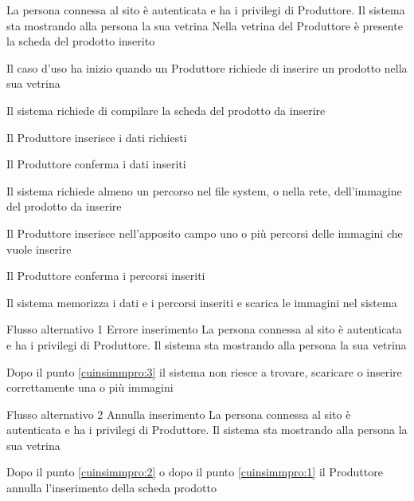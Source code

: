 
{}
{La persona connessa al sito è autenticata e ha i privilegi di Produttore. Il sistema sta mostrando alla persona la sua vetrina}
{Nella vetrina del Produttore è presente la scheda del prodotto inserito}
{\begin{enumCU}
		\item Il caso d'uso ha inizio quando un Produttore richiede di inserire un prodotto nella sua vetrina
		\item Il sistema richiede di compilare la scheda del prodotto da inserire
		\item Il Produttore inserisce i dati richiesti\label{cuinsimmpro:1}
		\item Il Produttore conferma i dati inseriti 
		\item Il sistema richiede almeno un percorso nel file system, o nella rete, dell'immagine del prodotto da inserire
		\item Il Produttore inserisce nell'apposito campo uno o più percorsi  delle immagini che vuole inserire\label{cuinsimmpro:2}
		\item Il Produttore conferma i percorsi inseriti\label{cuinsimmpro:3}
		\item Il sistema memorizza i dati e i percorsi inseriti e scarica le immagini nel sistema
	\end{enumCU}}
%
{Flusso alternativo 1}%
{Errore inserimento}%
{La persona connessa al sito è autenticata e ha i privilegi di Produttore. Il sistema sta mostrando alla persona la sua vetrina}%
{\postNulle}%
{\begin{enumCU}
		\item Dopo il punto \ref{cuinsimmpro:3} il sistema non riesce a trovare, scaricare o inserire correttamente una o più immagini
	\end{enumCU}}%
%
{Flusso alternativo 2}%
{Annulla inserimento}%
{La persona connessa al sito è autenticata e ha i privilegi di Produttore. Il sistema sta mostrando alla persona la sua vetrina}%
{\postNulle}%
{\begin{enumCU}
		\item Dopo il punto \ref{cuinsimmpro:2} o dopo il punto \ref{cuinsimmpro:1} il Produttore annulla l'inserimento della scheda prodotto
	\end{enumCU}}%

